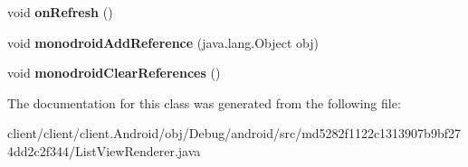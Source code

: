 \begin{DoxyCompactItemize}
\item 
\hypertarget{classmd5282f1122c1313907b9bf274dd2c2f344_1_1ListViewRenderer_afddec440a79386ee045391a8abda9c0e}{}void {\bfseries on\+Refresh} ()\label{classmd5282f1122c1313907b9bf274dd2c2f344_1_1ListViewRenderer_afddec440a79386ee045391a8abda9c0e}

\item 
\hypertarget{classmd5282f1122c1313907b9bf274dd2c2f344_1_1ListViewRenderer_a7c01d649bd9b9577acc012460c56894c}{}void {\bfseries monodroid\+Add\+Reference} (java.\+lang.\+Object obj)\label{classmd5282f1122c1313907b9bf274dd2c2f344_1_1ListViewRenderer_a7c01d649bd9b9577acc012460c56894c}

\item 
\hypertarget{classmd5282f1122c1313907b9bf274dd2c2f344_1_1ListViewRenderer_a5d99f7372725bc2a7ab6bfd63605578b}{}void {\bfseries monodroid\+Clear\+References} ()\label{classmd5282f1122c1313907b9bf274dd2c2f344_1_1ListViewRenderer_a5d99f7372725bc2a7ab6bfd63605578b}

\end{DoxyCompactItemize}


The documentation for this class was generated from the following file\+:\begin{DoxyCompactItemize}
\item 
client/client/client.\+Android/obj/\+Debug/android/src/md5282f1122c1313907b9bf274dd2c2f344/List\+View\+Renderer.\+java\end{DoxyCompactItemize}
